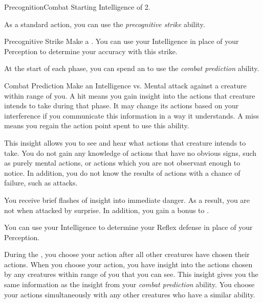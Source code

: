     \begin{feat}{Precognition}{Combat}
        \featpre Starting Intelligence of 2.

         As a standard action, you can use the \textit{precognitive strike} ability.
        \begin{ability}{Precognitive Strike}
            Make a .
            You can use your Intelligence in place of your Perception to determine your accuracy with this strike.
        \end{ability}

         At the start of each phase, you can spend an  to use the \textit{combat prediction} ability.
        \begin{ability}{Combat Prediction}
            Make an Intelligence vs. Mental attack against a creature within \rngmed range of you.
            A hit means you gain insight into the actions that creature intends to take during that phase.
            It may change its actions based on your interference if you communicate this information in a way it understands.
            A miss means you regain the action point spent to use this ability.

            This insight allows you to see and hear what actions that creature intends to take.
            You do not gain any knowledge of actions that have no obvious signs, such as purely mental actions, or actions which you are not observant enough to notice.
            In addition, you do not know the results of actions with a chance of failure, such as attacks.
        \end{ability}

         You receive brief flashes of insight into immediate danger.
        As a result, you are not  when attacked by surprise.
        In addition, you gain a  bonus to .

         You can use your Intelligence to determine your Reflex defense in place of your Perception.

         During the , you choose your action after all other creatures have chosen their actions.
        When you choose your action, you have insight into the actions chosen by any creatures within \rngclose range of you that you can see.
        This insight gives you the same information as the insight from your \textit{combat prediction} ability.
        You choose your actions simultaneously with any other creatures who have a similar ability.


\end{feat}
